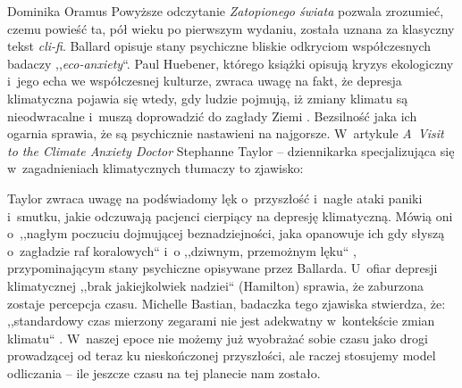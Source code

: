 \begin{artplenv}{Dominika Oramus}
Powyższe odczytanie \textit{Zatopionego świata} pozwala zrozumieć, czemu powieść ta, pół wieku po pierwszym wydaniu, została uznana za klasyczny tekst \textit{cli-fi}. Ballard opisuje stany psychiczne bliskie odkryciom współczesnych badaczy ,,\textit{eco-anxiety}``. Paul Huebener, którego książki opisują kryzys ekologiczny i~jego echa we współczesnej kulturze, zwraca uwagę na fakt, że depresja klimatyczna pojawia się wtedy, gdy ludzie pojmują, iż zmiany klimatu są nieodwracalne i~muszą doprowadzić do zagłady Ziemi
\parencite[][]{huebener_natures_2020}. %
 Bezsilność jaka ich ogarnia sprawia, że są psychicznie nastawieni na najgorsze. W~artykule \textit{A~Visit to the Climate Anxiety Doctor} Stephanne Taylor -- dziennikarka specjalizująca się w~zagadnieniach klimatycznych tłumaczy to zjawisko:


Taylor zwraca uwagę na podświadomy lęk o~przyszłość i~nagłe ataki paniki i~smutku, jakie odczuwają pacjenci cierpiący na depresję klimatyczną. Mówią oni o~,,nagłym poczuciu dojmującej beznadziejności, jaka opanowuje ich gdy słyszą o~zagładzie raf koralowych`` i~o ,,dziwnym, przemożnym lęku``
\parencite[][tłum. D.O.]{taylor_visit_2016}, %
 przypominającym stany psychiczne opisywane przez Ballarda. U~ofiar depresji klimatycznej ,,brak jakiejkolwiek nadziei`` (Hamilton) sprawia, że zaburzona zostaje percepcja czasu. Michelle Bastian, badaczka tego zjawiska stwierdza, że: ,,standardowy czas mierzony zegarami nie jest adekwatny w~kontekście zmian klimatu`` 
\parencite[][s.~39]{bastian_fatally_2012}. %
 W~naszej epoce nie możemy już wyobrażać sobie czasu jako drogi prowadzącej od teraz ku nieskończonej przyszłości, ale raczej stosujemy model odliczania -- ile jeszcze czasu na tej planecie nam zostało.


\end{artplenv}
